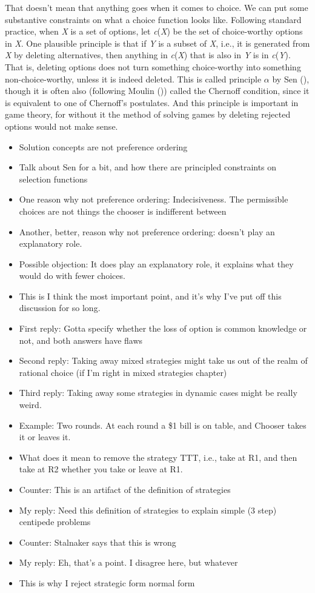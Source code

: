 \documentclass[
  12pt,
  letterpaper,
  DIV=11,
  numbers=noendperiod]{scrreprt}
\providecommand{\tightlist}{%
  \setlength{\itemsep}{0pt}\setlength{\parskip}{0pt}}\usepackage{longtable,booktabs,array}
\begin{document}
That doesn't mean that anything goes when it comes to choice. We can put
some substantive constraints on what a choice function looks like.
Following standard practice, when \emph{X} is a set of options, let
\emph{c}(\emph{X}) be the set of choice-worthy options in \emph{X}. One
plausible principle is that if \emph{Y} is a subset of \emph{X}, i.e.,
it is generated from \emph{X} by deleting alternatives, then anything in
\emph{c}(\emph{X}) that is also in \emph{Y} is in \emph{c}(\emph{Y}).
That is, deleting options does not turn something choice-worthy into
something non-choice-worthy, unless it is indeed deleted. This is called
principle \(\alpha\) by Sen (), though it is
often also (following Moulin ()) called
the Chernoff condition, since it is equivalent to one of Chernoff's
postulates. And this principle is important in game theory, for without
it the method of solving games by deleting rejected options would not
make sense.

\begin{itemize}
\tightlist
\item
  Solution concepts are not preference ordering
\item
  Talk about Sen for a bit, and how there are principled constraints on
  selection functions
\item
  One reason why not preference ordering: Indecisiveness. The
  permissible choices are not things the chooser is indifferent between
\item
  Another, better, reason why not preference ordering: doesn't play an
  explanatory role.
\item
  Possible objection: It does play an explanatory role, it explains what
  they would do with fewer choices.
\item
  This is I think the most important point, and it's why I've put off
  this discussion for so long.
\item
  First reply: Gotta specify whether the loss of option is common
  knowledge or not, and both answers have flaws
\item
  Second reply: Taking away mixed strategies might take us out of the
  realm of rational choice (if I'm right in mixed strategies chapter)
\item
  Third reply: Taking away some strategies in dynamic cases might be
  really weird.
\item
  Example: Two rounds. At each round a \$1 bill is on table, and Chooser
  takes it or leaves it.
\item
  What does it mean to remove the strategy TTT, i.e., take at R1, and
  then take at R2 whether you take or leave at R1.
\item
  Counter: This is an artifact of the definition of strategies
\item
  My reply: Need this definition of strategies to explain simple (3
  step) centipede problems
\item
  Counter: Stalnaker says that this is wrong
\item
  My reply: Eh, that's a point. I disagree here, but whatever
\item
  This is why I reject strategic form normal form
\end{itemize}
\end{document}
